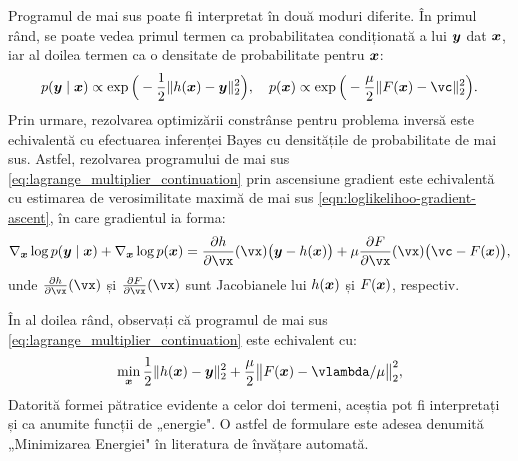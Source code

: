 \documentclass[../../book-main_ro.tex]{subfiles}
\begin{document}
Programul de mai sus poate fi interpretat în două moduri diferite. În primul rând, se poate vedea primul termen ca probabilitatea condiționată a lui $\bm{y}$ dat $\bm{x}$, iar al doilea termen ca o densitate de probabilitate pentru $\bm{x}$:
\begin{equation}
  p(\y\mid \x) \propto \exp\Big(- \frac{1}{2}\|h(\x) - \y\|_2^2\Big), \quad 
    p(\x) \propto \exp\Big( - \frac{\mu}{2}\|F(\x) - \vc\|_2^2\Big).
\end{equation} 
Prin urmare, rezolvarea optimizării constrânse pentru problema inversă este echivalentă cu efectuarea inferenței Bayes cu densitățile de probabilitate de mai sus. Astfel, rezolvarea programului de mai sus \eqref{eq:lagrange_multiplier_continuation} prin ascensiune gradient este echivalentă cu estimarea de verosimilitate maximă de mai sus \eqref{eqn:loglikelihoo-gradient-ascent}, 
în care gradientul ia forma:
\begin{equation}
   \nabla_{\x} \log p(\y \mid \x) + \nabla_{\x} \log p(\x)   =  \pdv{h}{\vx}(\vx)\big(\y - h(\x)\big) + \mu \pdv{F}{\vx}(\vx)\big(\vc - F(\x)\big),
\end{equation}
unde $\pdv{h}{\vx}(\vx)$ și $\pdv{F}{\vx}(\vx)$ sunt Jacobianele lui $h(\bm{x})$ și $F(\bm{x})$, respectiv.

În al doilea rând, observați că programul de mai sus \eqref{eq:lagrange_multiplier_continuation} este echivalent cu:
\begin{equation}
\min_{\x} \frac{1}{2}\|h(\x) - \y\|_2^2 + \frac{\mu}{2} \big\|F(\x) - \vlambda/\mu\big\|_2^2,
\label{eqn:energy-minimization}
\end{equation} 
Datorită formei pătratice evidente a celor doi termeni, aceștia pot fi interpretați și ca anumite funcții de „energie". O astfel de formulare este adesea denumită „Minimizarea Energiei" în literatura de învățare automată.
\end{document}
